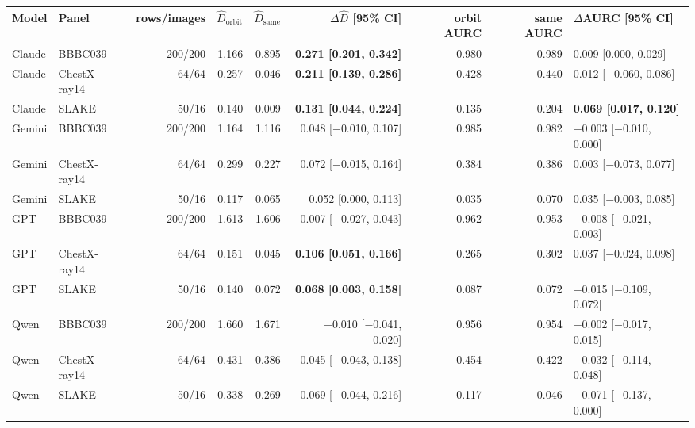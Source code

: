 \begin{tabular}{llrrrrrrl}
\toprule
Model & Panel & rows/images &
$\widehat D_{\mathrm{orbit}}$ &
$\widehat D_{\mathrm{same}}$ &
$\Delta\widehat D$ [95\% CI] &
orbit AURC &
same AURC &
$\Delta$AURC [95\% CI] \\
\midrule
Claude & BBBC039 & 200/200 & 1.166 & 0.895 &
\textbf{0.271 [0.201, 0.342]} & 0.980 & 0.989 & 0.009 [0.000, 0.029] \\
Claude & ChestX-ray14 & 64/64 & 0.257 & 0.046 &
\textbf{0.211 [0.139, 0.286]} & 0.428 & 0.440 & 0.012 [$-$0.060, 0.086] \\
Claude & SLAKE & 50/16 & 0.140 & 0.009 &
\textbf{0.131 [0.044, 0.224]} & 0.135 & 0.204 &
\textbf{0.069 [0.017, 0.120]} \\
\addlinespace
Gemini & BBBC039 & 200/200 & 1.164 & 1.116 &
0.048 [$-$0.010, 0.107] & 0.985 & 0.982 & $-$0.003 [$-$0.010, 0.000] \\
Gemini & ChestX-ray14 & 64/64 & 0.299 & 0.227 &
0.072 [$-$0.015, 0.164] & 0.384 & 0.386 & 0.003 [$-$0.073, 0.077] \\
Gemini & SLAKE & 50/16 & 0.117 & 0.065 &
0.052 [0.000, 0.113] & 0.035 & 0.070 & 0.035 [$-$0.003, 0.085] \\
\addlinespace
GPT & BBBC039 & 200/200 & 1.613 & 1.606 &
0.007 [$-$0.027, 0.043] & 0.962 & 0.953 & $-$0.008 [$-$0.021, 0.003] \\
GPT & ChestX-ray14 & 64/64 & 0.151 & 0.045 &
\textbf{0.106 [0.051, 0.166]} & 0.265 & 0.302 & 0.037 [$-$0.024, 0.098] \\
GPT & SLAKE & 50/16 & 0.140 & 0.072 &
\textbf{0.068 [0.003, 0.158]} & 0.087 & 0.072 & $-$0.015 [$-$0.109, 0.072] \\
\addlinespace
Qwen & BBBC039 & 200/200 & 1.660 & 1.671 &
$-$0.010 [$-$0.041, 0.020] & 0.956 & 0.954 & $-$0.002 [$-$0.017, 0.015] \\
Qwen & ChestX-ray14 & 64/64 & 0.431 & 0.386 &
0.045 [$-$0.043, 0.138] & 0.454 & 0.422 & $-$0.032 [$-$0.114, 0.048] \\
Qwen & SLAKE & 50/16 & 0.338 & 0.269 &
0.069 [$-$0.044, 0.216] & 0.117 & 0.046 & $-$0.071 [$-$0.137, 0.000] \\
\bottomrule
\end{tabular}
